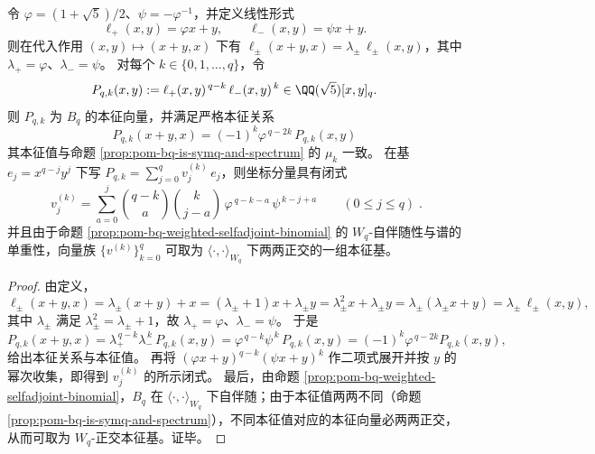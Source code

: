 \begin{proposition}\label{prop:pom-bq-explicit-diagonalization-linear-forms}
令 \(\varphi=(1+\sqrt5)/2\)、\(\psi=-\varphi^{-1}\)，并定义线性形式
\[
\ell_+(x,y)=\varphi x+y,\qquad \ell_-(x,y)=\psi x+y.
\]
则在代入作用 \((x,y)\mapsto(x+y,x)\) 下有
\(
\ell_\pm(x+y,x)=\lambda_\pm\,\ell_\pm(x,y)
\)，其中 \(\lambda_+=\varphi\)、\(\lambda_-=\psi\)。
对每个 \(k\in\{0,1,\dots,q\}\)，令
\[
P_{q,k}(x,y):=\ell_+(x,y)^{\,q-k}\,\ell_-(x,y)^{\,k}\in\QQ(\sqrt5)[x,y]_q.
\]
则 \(P_{q,k}\) 为 \(B_q\) 的本征向量，并满足严格本征关系
\[
\boxed{\;P_{q,k}(x+y,x)=(-1)^k\varphi^{\,q-2k}\,P_{q,k}(x,y)\;}
\]
其本征值与命题 \ref{prop:pom-bq-is-symq-and-spectrum} 的 \(\mu_k\) 一致。
在基 \(e_j=x^{q-j}y^j\) 下写 \(P_{q,k}=\sum_{j=0}^{q} v^{(k)}_j\,e_j\)，则坐标分量具有闭式
\[
\boxed{\;
v^{(k)}_j
=\sum_{a=0}^{j}
\binom{q-k}{a}\binom{k}{j-a}\,
\varphi^{\,q-k-a}\,
\psi^{\,k-j+a}\qquad(0\le j\le q)\; } .
\]
并且由于命题 \ref{prop:pom-bq-weighted-selfadjoint-binomial} 的 \(W_q\)-自伴随性与谱的单重性，向量族 \(\{v^{(k)}\}_{k=0}^{q}\) 可取为 \(\langle\cdot,\cdot\rangle_{W_q}\) 下两两正交的一组本征基。
\end{proposition}
\begin{proof}
由定义，
\[
\ell_\pm(x+y,x)=\lambda_\pm(x+y)+x=(\lambda_\pm+1)x+\lambda_\pm y=\lambda_\pm^2 x+\lambda_\pm y=\lambda_\pm(\lambda_\pm x+y)=\lambda_\pm\,\ell_\pm(x,y),
\]
其中 \(\lambda_\pm\) 满足 \(\lambda_\pm^2=\lambda_\pm+1\)，故 \(\lambda_+=\varphi\)、\(\lambda_-=\psi\)。
于是
\[
P_{q,k}(x+y,x)=\lambda_+^{\,q-k}\lambda_-^{\,k}\,P_{q,k}(x,y)=\varphi^{\,q-k}\psi^{\,k}\,P_{q,k}(x,y)=(-1)^k\varphi^{\,q-2k}P_{q,k}(x,y),
\]
给出本征关系与本征值。
再将
\(
(\varphi x+y)^{q-k}(\psi x+y)^k
\)
作二项式展开并按 \(y\) 的幂次收集，即得到 \(v^{(k)}_j\) 的所示闭式。
最后，由命题 \ref{prop:pom-bq-weighted-selfadjoint-binomial}，\(B_q\) 在 \(\langle\cdot,\cdot\rangle_{W_q}\) 下自伴随；由于本征值两两不同（命题 \ref{prop:pom-bq-is-symq-and-spectrum}），不同本征值对应的本征向量必两两正交，从而可取为 \(W_q\)-正交本征基。证毕。
\end{proof}

